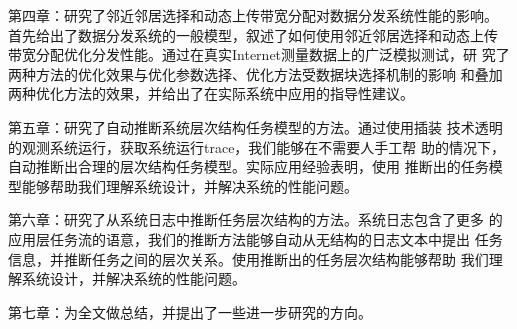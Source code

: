  第四章：研究了邻近邻居选择和动态上传带宽分配对数据分发系统性能的影响。
  首先给出了数据分发系统的一般模型，叙述了如何使用邻近邻居选择和动态上传
  带宽分配优化分发性能。通过在真实Internet测量数据上的广泛模拟测试，研
  究了两种方法的优化效果与优化参数选择、优化方法受数据块选择机制的影响
  和叠加两种优化方法的效果，并给出了在实际系统中应用的指导性建议。

  第五章：研究了自动推断系统层次结构任务模型的方法。通过使用插装
  技术透明的观测系统运行，获取系统运行trace，我们能够在不需要人手工帮
  助的情况下，自动推断出合理的层次结构任务模型。实际应用经验表明，使用
  推断出的任务模型能够帮助我们理解系统设计，并解决系统的性能问题。

  第六章：研究了从系统日志中推断任务层次结构的方法。系统日志包含了更多
  的应用层任务流的语意，我们的推断方法能够自动从无结构的日志文本中提出
  任务信息，并推断任务之间的层次关系。使用推断出的任务层次结构能够帮助
  我们理解系统设计，并解决系统的性能问题。

  第七章：为全文做总结，并提出了一些进一步研究的方向。


